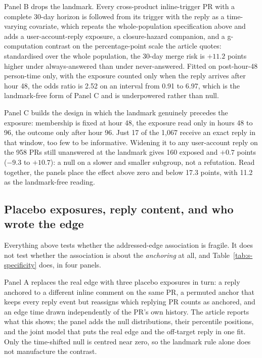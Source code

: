 \documentclass[pdflatex,sn-basic]{sn-jnl}
\begin{document}
Panel B drops the landmark. Every cross-product inline-trigger PR with a
complete 30-day horizon is followed from its trigger with the reply as a
time-varying covariate, which repeats the whole-population specification above
and adds a user-account-reply exposure, a closure-hazard companion, and a
g-computation contrast on the percentage-point scale the article quotes:
standardised over the whole population, the 30-day merge risk is $+11.2$ points
higher under always-answered than under never-answered. Fitted on post-hour-48
person-time only, with the exposure counted only when the reply arrives after
hour 48, the odds ratio is 2.52 on an interval from 0.91 to 6.97, which is the
landmark-free form of Panel C and is underpowered rather than null.

Panel C builds the design in which the landmark genuinely precedes the exposure:
membership is fixed at hour 48, the exposure read only in hours 48 to 96, the
outcome only after hour 96. Just 17 of the 1,067 receive an exact reply in that
window, too few to be informative. Widening it to any user-account reply on the
958 PRs still unanswered at the landmark gives 160 exposed and $+0.7$ points
($-9.3$ to $+10.7$): a null on a slower and smaller subgroup, not a refutation.
Read together, the panels place the effect above zero and below 17.3 points,
with 11.2 as the landmark-free reading.



\subsection{Placebo exposures, reply content, and who wrote the edge}\label{app:specificity}

Everything above tests whether the addressed-edge association is fragile. It
does not test whether the association is about the \emph{anchoring} at all, and
Table~\ref{tab:s-specificity} does, in four panels.

Panel A replaces the real edge with three placebo exposures in turn: a reply
anchored to a different inline comment on the same PR, a permuted anchor that
keeps every reply event but reassigns which replying PR counts as anchored, and
an edge time drawn independently of the PR's own history. The article reports
what this shows; the panel adds the null distributions, their percentile
positions, and the joint model that puts the real edge and the off-target reply
in one fit. Only the time-shifted null is centred near zero, so the landmark
rule alone does not manufacture the contrast.
\end{document}
